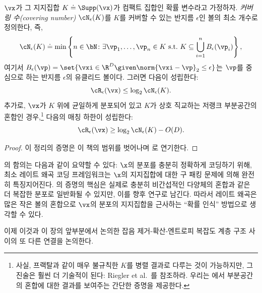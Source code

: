 \documentclass[../../book-main_ko.tex]{subfiles}
\begin{document}
\begin{theorem}\label{thm:covering-number-rate-distortion}
	\(\vx\)가 그 지지집합 \(K \doteq \Supp(\vx)\)가 컴팩트 집합인 확률 변수라고 가정하자. \textit{커버링 수(covering number)} \(\cN_{\epsilon}(K)\)를 $K$를 커버할 수 있는 반지름 \(\epsilon\)인 볼의 최소 개수로 정의한다, 즉,
	\begin{equation}
		\cN_{\epsilon}(K) \doteq \min\left\{n \in \bN \colon \exists \vp_{1}, \dots, \vp_{n} \in K\ \text{s.t.}\ K \subseteq \bigcup_{i = 1}^{n}B_{\epsilon}(\vp_{i})\right\},
	\end{equation}
	여기서 \(B_{\epsilon}(\vp) = \set{\vxi\in \R^D \given \norm{\vxi - \vp}_2 \leq \epsilon}\)는 \(\vp\)를 중심으로 하는 반지름 \(\epsilon\)의 유클리드 볼이다.
	그러면 다음이 성립한다:
	\begin{equation}
		\cR_{\epsilon}(\vx)
		\leq \log_{2} \cN_{\epsilon}(K).
	\end{equation}
	추가로, $\vx$가 $K$ 위에 균일하게 분포되어 있고 $K$가 상호 직교하는 저랭크 부분공간의 혼합인 경우,\footnote{사실, 프랙탈과 같이 매우 불규칙한 $K$를 병렬 결과로 다루는 것이 가능하지만, 그 진술은 훨씬 더 기술적이 된다: Riegler et al.\ \cite{Riegler2018-jh,Riegler2023-rr}를 참조하라. 우리는 에서 부분공간의 혼합에 대한 결과를 보여주는 간단한 증명을 제공한다.}
	다음의 매칭 하한이 성립한다:
	\begin{equation}
		\cR_{\epsilon}(\vx)
		\geq
		\log_{2} \cN_{\epsilon}(K) - O(D).
	\end{equation}
\end{theorem}
\begin{proof}
이 정리의 증명은 이 책의 범위를 벗어나며 로 연기한다.
\end{proof}

의 함의는 다음과 같이 요약할 수 있다: $\x$의 분포를 충분히 정확하게 코딩하기 위해, 최소 레이트 왜곡 코딩 프레임워크는 $\x$의 지지집합에 대한 구 패킹 문제에 의해 완전히 특징지어진다.
의 증명의 핵심은 실제로 충분히 비간섭적인 다양체의 혼합과 같은 더 복잡한 분포로 일반화될 수 있지만, 이를 향후 연구로 남긴다.
따라서 레이트 왜곡은 많은 작은 볼의 혼합으로 \(\vx\)의 분포의 지지집합을 근사하는 ``확률 인식'' 방법으로 생각할 수 있다.

이제 이것과 이 장의 앞부분에서 논의한 잡음 제거-확산-엔트로피 복잡도 계층 구조 사이의 또 다른 연결을 논의한다.
\end{document}
